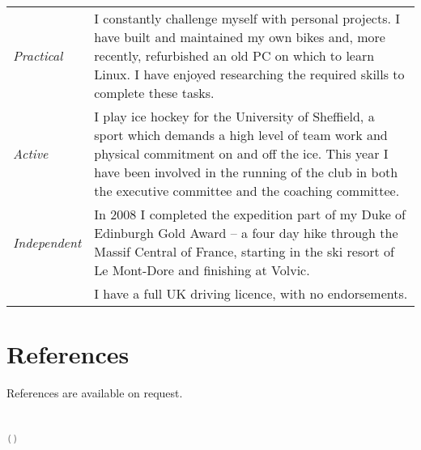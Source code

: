 \documentclass[oneside,a4paper]{article}
\begin{document}
\hspace{-6pt}\begin{tabular}{>{\it}lp{430pt}}
Practical & I constantly challenge myself with personal projects. I have built and maintained my own bikes and, more recently, refurbished an old PC on which to learn Linux. I have enjoyed researching the required skills to complete these tasks. \\[4pt]
Active & I play ice hockey for the University of Sheffield, a sport which demands a high level of team work and physical commitment on and off the ice. This year I have been involved in the running of the club in both the executive committee and the coaching committee. \\[4pt]
Independent & In 2008 I completed the expedition part of my Duke of Edinburgh Gold Award -- a four day hike through the Massif Central of France, starting in the ski resort of Le Mont-Dore and finishing at Volvic. \\[4pt]
& I have a full UK driving licence, with no endorsements.
\end{tabular}

\section*{References}

References are available on request.
\\\\\\
\small\texttt{\textcolor{Gray}{\VCDateTEX\;\;(\GITAbrHash)}}

\end{document}
